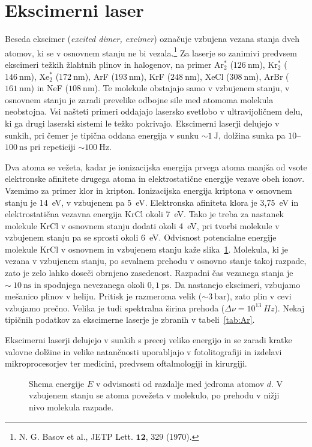 \section{Ekscimerni laser}
Beseda ekscimer ({\it excited dimer, excimer}) označuje vzbujena vezana 
stanja dveh atomov, 
ki se v osnovnem stanju ne bi vezala.\footnote{N. G. Basov et al., JETP Lett.
$\mathbf{12}$, 329 (1970).}
Za laserje so zanimivi predvsem ekscimeri
težkih žlahtnih plinov in halogenov, na primer Ar$_2^*$ ($126~\si{\nano\metre}$), 
Kr$_2^*$ ($146~\si{\nano\metre}$), Xe$_2^*$ ($172~\si{\nano\metre}$),
ArF ($193~\si{\nano\metre}$), KrF ($248~\si{\nano\metre}$), 
XeCl ($308~\si{\nano\metre}$), ArBr ($161~\si{\nano\metre}$) in 
NeF ($108~\si{\nano\metre}$). Te molekule obstajajo samo v vzbujenem stanju,
v osnovnem stanju  je zaradi prevelike odbojne sile med atomoma molekula neobstojna.
Vsi našteti primeri oddajajo lasersko svetlobo v
ultravijoličnem delu, ki ga drugi laserski sistemi le težko pokrivajo. 
Ekscimerni laserji delujejo v sunkih, pri čemer je tipična oddana energija v sunku 
$\sim 1~\si{\joule}$, dolžina sunka pa $10$--$100~\si{\nano\second}$ pri repeticiji
$\sim 100~\si{\hertz}$.

Dva atoma se vežeta, kadar je ionizacijska energija prvega
atoma manjša od vsote elektronske afinitete drugega atoma in
elektrostatične energije vezave obeh ionov. Vzemimo za primer klor in
kripton. Ionizacijska energija kriptona v osnovnem stanju je 14~eV, v
vzbujenem pa 5~eV. Elektronska afiniteta klora je 3,75~eV in
elektrostatična vezavna energija KrCl okoli 7~eV. Tako je treba za nastanek
molekule KrCl v osnovnem stanju dodati okoli 4~eV, pri tvorbi
molekule v vzbujenem stanju pa se sprosti okoli 6~eV. Odvisnost
potencialne energije molekule KrCl v osnovnem in vzbujenem stanju
kaže slika~\ref{fig:exE}. Molekula, ki je vezana v vzbujenem stanju, po
sevalnem prehodu v osnovno stanje takoj razpade, zato je zelo lahko doseči
obrnjeno zasedenost. Razpadni čas vezanega stanja je $\sim~10~\si{\nano\second}$ in
spodnjega nevezanega okoli $0,1~\si{\pico\second}$.
Da nastanejo ekscimeri, vzbujamo mešanico 
plinov v heliju. Pritisk
je razmeroma velik ($\sim 3~\si{\bar}$), zato plin v cevi vzbujamo prečno.
Velika je tudi spektralna širina prehoda ($\Delta\nu = 10^{13}~\si{Hz}$). Nekaj tipičnih podatkov 
za ekscimerne laserje je zbranih v tabeli~\ref{tab:Ar}.

Ekscimerni laserji delujejo v sunkih s precej 
veliko energijo in se zaradi kratke valovne
dolžine in velike natančnosti uporabljajo v 
fotolitografiji in izdelavi mikroprocesorjev 
ter medicini, predvsem oftalmologiji in kirurgiji.
\begin{figure}[ht]
\centering
\def\svgwidth{45truemm} 

\caption{Shema energije $E$ v odvisnosti od razdalje med jedroma atomov $d$. 
V vzbujenem stanju
se atoma povežeta v molekulo, po prehodu v nižji nivo  molekula razpade.}
\label{fig:exE}
\end{figure}

